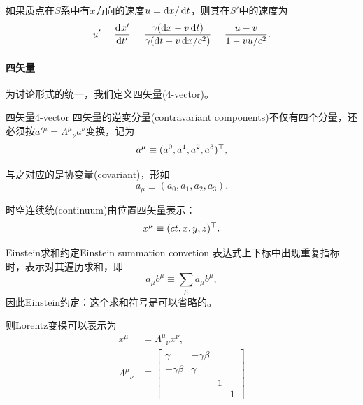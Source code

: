 如果质点在$S$系中有$x$方向的速度$u = \mathop{}\!\mathrm{d} x/\mathop{}\!\mathrm{d} t$，则其在$S'$中的速度为
\begin{equation}
    u' = \frac{\mathop{}\!\mathrm{d}^{}x'}{\mathrm{d}{t'}^{}} = \frac{\gamma(\mathop{}\!\mathrm{d} x - v\mathop{}\!\mathrm{d} t)}{\gamma(\mathop{}\!\mathrm{d} t - v\mathop{}\!\mathrm{d} x/c^2)} = \frac{u - v}{1 - vu/c^2}.
\end{equation}

\paragraph{四矢量}

为讨论形式的统一，我们定义四矢量(4-vector)。

\begin{definition}{四矢量}{4-vector}
    四矢量的逆变分量(contravariant components)不仅有四个分量，还必须按$a'{}^\mu = \Lambda^\mu{}_\nu a^\nu$变换，记为
    \begin{equation}
        a^\mu \equiv (a^0,a^1,a^2,a^3)^\top,
    \end{equation}

    与之对应的是协变量(covariant)，形如
    \begin{equation}
        a_\mu \equiv (a_0,a_1,a_2,a_3).
    \end{equation}
\end{definition}
时空连续统(continuum)由位置四矢量表示：
\begin{equation}
    x^\mu \equiv (ct,x,y,z)^\top.
\end{equation}
\begin{definition}{Einstein求和约定}{Einstein summation convetion}
    表达式上下标中出现重复指标时，表示对其遍历求和，即
    \begin{equation}
        a_\mu b^\mu \equiv \sum_\mu a_\mu b^\mu,
    \end{equation}
    因此Einstein约定：这个求和符号是可以省略的。
\end{definition}
则Lorentz变换可以表示为
\begin{subequations}
    \label{eq:ed-boost-matrix}
    \begin{align}
        \bar x^\mu &= \Lambda^\mu{}_\nu x^\nu,\\
        \Lambda^\mu{}_\nu &\equiv
            \begin{bmatrix}
                \gamma&-\gamma\beta\\-\gamma\beta&\gamma\\ &&1\\ &&&1
            \end{bmatrix}
    \end{align}
\end{subequations}

